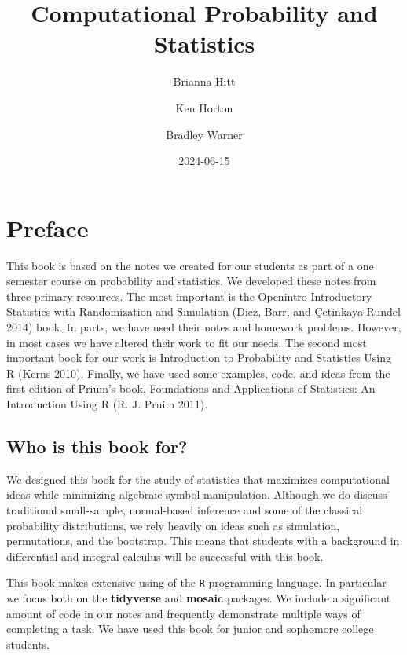 \documentclass[
  letterpaper,
  DIV=11,
  numbers=noendperiod]{scrreprt}
\title{Computational Probability and Statistics}
\author{Brianna Hitt \and Ken Horton \and Bradley Warner}
\date{2024-06-15}
\renewcommand*\contentsname{Table of contents}
\newcommand\contentsname{Table of contents}
\begin{document}
\maketitle

\renewcommand*\contentsname{Table of contents}
{
\hypersetup{linkcolor=}
\setcounter{tocdepth}{2}
\tableofcontents
}

\chapter*{Preface}\label{preface}


This book is based on the notes we created for our students as part of a
one semester course on probability and statistics. We developed these
notes from three primary resources. The most important is the Openintro
Introductory Statistics with Randomization and Simulation (Diez, Barr,
and Çetinkaya-Rundel 2014) book. In parts, we have used their notes and
homework problems. However, in most cases we have altered their work to
fit our needs. The second most important book for our work is
Introduction to Probability and Statistics Using R (Kerns 2010).
Finally, we have used some examples, code, and ideas from the first
edition of Prium's book, Foundations and Applications of Statistics: An
Introduction Using R (R. J. Pruim 2011).

\section*{Who is this book for?}\label{who-is-this-book-for}


We designed this book for the study of statistics that maximizes
computational ideas while minimizing algebraic symbol manipulation.
Although we do discuss traditional small-sample, normal-based inference
and some of the classical probability distributions, we rely heavily on
ideas such as simulation, permutations, and the bootstrap. This means
that students with a background in differential and integral calculus
will be successful with this book.

This book makes extensive using of the \texttt{R} programming language.
In particular we focus both on the \textbf{tidyverse} and
\textbf{mosaic} packages. We include a significant amount of code in our
notes and frequently demonstrate multiple ways of completing a task. We
have used this book for junior and sophomore college students.
\end{document}
